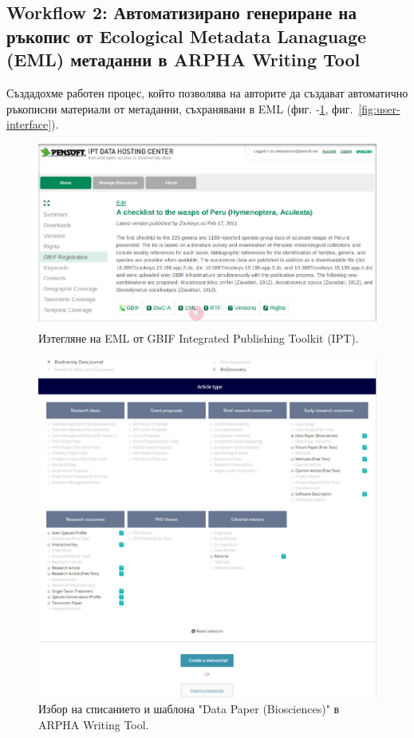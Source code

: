 \subsection {Workflow 2: Автоматизирано генериране на ръкопис от Ecological Metadata Lanaguage (EML) метаданни в ARPHA Writing Tool}

Създадохме работен процес, който позволява на авторите да създават автоматично ръкописни материали от метаданни, съхранявани в EML (фиг. -\ref{fig:EML-download}, фиг.~\ref{fig:user-interface}).
\begin{figure}
\centering
\includegraphics[width=\textwidth]{Figures/EML-download}
\decoRule
\caption{Изтегляне на EML от GBIF Integrated Publishing Toolkit (IPT).}
\label{fig:EML-download}
\end{figure}

\begin{figure}
\centering
\includegraphics[width=\textwidth]{Figures/journal-selection}
\decoRule
\caption{Избор на списанието и шаблона "Data Paper (Biosciences)" в ARPHA Writing Tool.}
\label{fig:journal-selection}
\end{figure}

